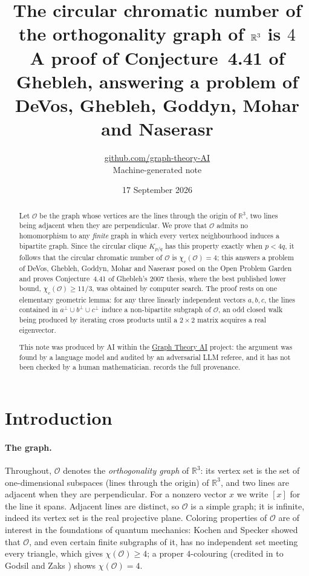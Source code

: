 \documentclass[11pt,a4paper]{article}
\title{The circular chromatic number of the orthogonality graph of $\R^3$ is $4$\\[4pt]
\large A proof of Conjecture~4.41 of Ghebleh, answering a problem of DeVos, Ghebleh, Goddyn, Mohar and Naserasr}
\author{\href{https://github.com/graph-theory-AI}{github.com/graph-theory-AI}\\[2pt] \normalsize Machine-generated note}
\date{17 September 2026}
\theoremstyle{plain}
\theoremstyle{definition}
\theoremstyle{remark}
\newcommand{\cO}{\mathcal O}
\newcommand{\R}{\mathbb R}
\newcommand{\chic}{\chi_c}
\newcommand{\Kc}[2]{K_{#1/#2}}
\begin{document}
\maketitle

\begin{abstract}
Let $\cO$ be the graph whose vertices are the lines through the origin of $\R^3$, two lines being adjacent when they are perpendicular. We prove that $\cO$ admits no homomorphism to any \emph{finite} graph in which every vertex neighbourhood induces a bipartite graph. Since the circular clique $\Kc pq$ has this property exactly when $p<4q$, it follows that the circular chromatic number of $\cO$ is $\chic(\cO)=4$; this answers a problem of DeVos, Ghebleh, Goddyn, Mohar and Naserasr posed on the Open Problem Garden and proves Conjecture~4.41 of Ghebleh's 2007 thesis, where the best published lower bound, $\chic(\cO)\ge 11/3$, was obtained by computer search. The proof rests on one elementary geometric lemma: for any three linearly independent vectors $a,b,c$, the lines contained in $a^\perp\cup b^\perp\cup c^\perp$ induce a non-bipartite subgraph of $\cO$, an odd closed walk being produced by iterating cross products until a $2\times2$ matrix acquires a real eigenvector.

\medskip\noindent\small
This note was produced by AI within the \href{https://github.com/graph-theory-AI/Graph-Theory-LLM-Proofs}{Graph Theory AI} project:
the argument was found by a language model and audited by an adversarial LLM
referee, and it has not been checked by a human mathematician.
 records the full provenance.
\end{abstract}

\section{Introduction}

\paragraph{The graph.} Throughout, $\cO$ denotes the \emph{orthogonality graph} of $\R^3$: its vertex set is the set of one-dimensional subspaces (lines through the origin) of $\R^3$, and two lines are adjacent when they are perpendicular. For a nonzero vector $x$ we write $[x]$ for the line it spans. Adjacent lines are distinct, so $\cO$ is a simple graph; it is infinite, indeed its vertex set is the real projective plane. Coloring properties of $\cO$ are of interest in the foundations of quantum mechanics: Kochen and Specker \cite{KS67} showed that $\cO$, and even certain finite subgraphs of it, has no independent set meeting every triangle, which gives $\chi(\cO)\ge4$; a proper $4$-colouring (credited in \cite{Ghebleh07} to Godsil and Zaks \cite{GZ88}) shows $\chi(\cO)=4$.
\end{document}
